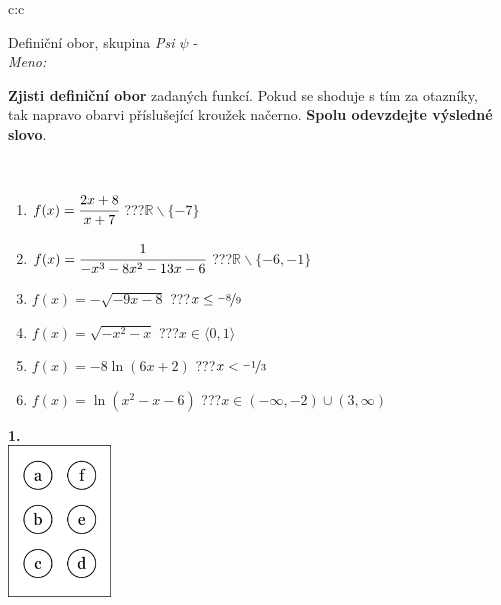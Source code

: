 \documentclass[10pt]{report}
\begin{document}
\begin{tabular}{c:c}
\begin{minipage}[c][104.5mm][t]{0.5\linewidth}
\begin{center}
\vspace{7mm}
{\huge Definiční obor, skupina \textit{Psi $\psi$} -}\\[5mm]
\textit{Meno:}\phantom{xxxxxxxxxxxxxxxxxxxxxxxxxxxxxxxxxxxxxxxxxxxxxxxxxxxxxxxxxxxxxxxxx}\\[5mm]
\begin{minipage}{0.95\linewidth}
\textbf{Zjisti definiční obor} zadaných funkcí. Pokud se shoduje s tím za otazníky,\\tak napravo obarvi příslušející kroužek načerno. \textbf{Spolu odevzdejte výsledné slovo}.
\end{minipage}
\\[1mm]
\begin{minipage}{0.79\linewidth}
\begin{center}
\begin{varwidth}{\linewidth}
\begin{enumerate}
\normalsizerrr
\item $f(x)=\cfrac{2x+8}{x+7}$\quad \dotfill\; ???\;\dotfill \quad $\mathbb{R}\smallsetminus\{-7\}$
\item $f(x)=\cfrac{1}{-x^3-8x^2-13x-6}$\quad \dotfill\; ???\;\dotfill \quad $\mathbb{R}\smallsetminus\{-6,-1\}$
\item $f(x)=-\sqrt{-9x-8}$\quad \dotfill\; ???\;\dotfill \quad $x\leq\nicefrac{-8}{9}$
\item $f(x)=\sqrt{-x^2-x}$\quad \dotfill\; ???\;\dotfill \quad $x\in\langle0 , 1\rangle$
\item $f(x)=-8\ln{(6x+2)}$\quad \dotfill\; ???\;\dotfill \quad $x<\nicefrac{-1}{3}$
\item $f(x)=\ln{(x^2-x-6)}$\quad \dotfill\; ???\;\dotfill \quad $x\in(-\infty , -2)\cup(3 , \infty)$
\end{enumerate}
\end{varwidth}
\end{center}
\end{minipage}
\begin{minipage}{0.20\linewidth}
\begin{center}
{\Huge\bfseries 1.} \\[2mm]
\includegraphics[height=40mm]{../images/braille.png}

\end{center}
\end{minipage}
\end{center}
\end{minipage}
\end{tabular}
\end{document}
